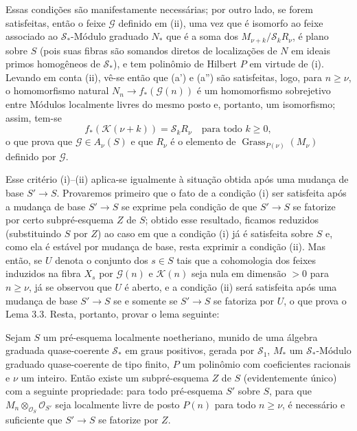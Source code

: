 Essas condições são manifestamente necessárias; por outro lado, se forem
satisfeitas, então o feixe $\mathcal G$ definido em (ii), uma vez que é
isomorfo ao feixe associado ao $\mathcal S_*$-Módulo graduado $N_*$ que é a
soma dos $M_{\nu+k}/\mathcal S_kR_\nu$, é plano sobre $S$ (pois suas fibras
são somandos diretos de localizações de $N$ em ideais primos homogêneos de
$\mathcal S_*$), e tem polinômio de Hilbert $P$ em virtude de (i). Levando em
conta (ii), vê-se então que (a') e (a'') são satisfeitas, logo, para
$n\geq\nu$, o homomorfismo natural $N_n\longrightarrow f_*(\mathcal G(n))$ é
um homomorfismo sobrejetivo entre Módulos localmente livres do mesmo posto e,
portanto, um isomorfismo; assim, tem-se
\[
f_*(\mathcal K(\nu+k))=\mathcal S_kR_\nu
\quad\text{para todo $k\geq0$},
\]
o que prova que $\mathcal G\in A_\nu(S)$ e que $R_\nu$ é o elemento de
$\operatorname{Grass}_{P(\nu)}(M_\nu)$ definido por $\mathcal G$.

Esse critério (i)--(ii) aplica-se igualmente à situação obtida após uma
mudança de base $S'\longrightarrow S$. Provaremos primeiro que o fato de a
condição (i) ser satisfeita após a mudança de base $S'\longrightarrow S$ se
exprime pela condição de que $S'\longrightarrow S$ se fatorize por certo
subpré-esquema $Z$ de $S$; obtido esse resultado, ficamos reduzidos
(substituindo $S$ por $Z$) ao caso em que a condição (i) já é satisfeita sobre
$S$ e, como ela é estável por mudança de base, resta exprimir a condição (ii).
Mas então, se $U$ denota o conjunto dos $s\in S$ tais que a cohomologia dos
feixes induzidos na fibra $X_s$ por $\mathcal G(n)$ e $\mathcal K(n)$ seja nula
em dimensão $>0$ para $n\geq\nu$, já se observou que $U$ é aberto, e a condição
(ii) será satisfeita após uma mudança de base $S'\longrightarrow S$ se e somente
se $S'\longrightarrow S$ se fatoriza por $U$, o que prova o Lema 3.3. Resta,
portanto, provar o lema seguinte:

 Sejam $S$ um pré-esquema localmente noetheriano, munido de
uma álgebra graduada quase-coerente $\mathcal S_*$ em graus positivos, gerada
por $\mathcal S_1$, $M_*$ um $\mathcal S_*$-Módulo graduado quase-coerente de tipo
finito, $P$ um polinômio com coeficientes racionais e $\nu$ um inteiro. Então
existe um subpré-esquema $Z$ de $S$ (evidentemente único)
com a seguinte propriedade: para todo pré-esquema $S'$ sobre $S$, para que
$M_n\otimes_{\mathcal O_S}\mathcal O_{S'}$ seja localmente livre de posto
$P(n)$ para todo $n\geq\nu$, é necessário e suficiente que
$S'\longrightarrow S$ se fatorize por $Z$.

